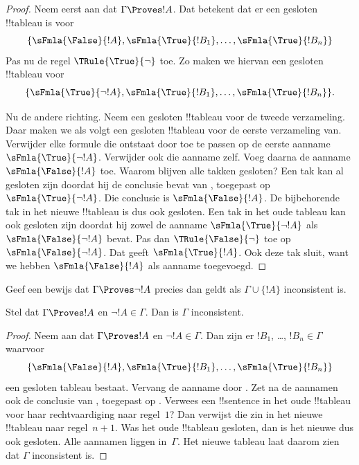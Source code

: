 \documentclass[../../../include/open-logic-section]{subfiles}
\begin{document}
\begin{proof}
Neem eerst aan dat $\Gamma \Proves !A$. Dat betekent dat er een
gesloten !!{tableau} is voor
\[
\{\sFmla{\False}{!A},
\sFmla{\True}{!B_1}, \dots, \sFmla{\True}{!B_n}\}
\]
Pas nu de regel $\TRule{\True}{\lnot}$ toe. Zo maken we hiervan een
gesloten !!{tableau} voor
\[
\{\sFmla{\True}{\lnot !A},
\sFmla{\True}{!B_1}, \dots, \sFmla{\True}{!B_n}\}.
\]

Nu de andere richting. Neem een gesloten !!{tableau} voor de tweede
verzameling. Daar maken we als volgt een gesloten !!{tableau} voor de
eerste verzameling van. Verwijder elke formule die ontstaat door
\TRule{\True}{\lnot} toe te passen op de eerste aanname
$\sFmla{\True}{\lnot !A}$. Verwijder ook die aanname zelf. Voeg daarna
de aanname $\sFmla{\False}{!A}$ toe.
Waarom blijven alle takken gesloten? Een tak kan al gesloten zijn
doordat hij de conclusie bevat van \TRule{\True}{\lnot}, toegepast op
$\sFmla{\True}{\lnot !A}$. Die conclusie is
$\sFmla{\False}{!A}$. De bijbehorende tak in het nieuwe !!{tableau} is
dus ook gesloten. Een tak in het oude tableau kan ook gesloten zijn
doordat hij zowel de aanname $\sFmla{\True}{\lnot !A}$ als
$\sFmla{\False}{\lnot !A}$ bevat. Pas dan
$\TRule{\False}{\lnot}$ toe op $\sFmla{\False}{\lnot !A}$. Dat geeft
$\sFmla{\True}{!A}$. Ook deze tak sluit, want we hebben
$\sFmla{\False}{!A}$ als aanname toegevoegd.
\end{proof}

\begin{prob}
Geef een bewijs dat $\Gamma \Proves \lnot !A$ precies dan geldt als
$\Gamma \cup \{!A\}$ inconsistent is.
\end{prob}

\begin{prop}
  Stel dat $\Gamma \Proves !A$ en $\lnot !A \in \Gamma$. Dan is
  $\Gamma$ inconsistent.
\end{prop}

\begin{proof}
  Neem aan dat $\Gamma \Proves !A$ en $\lnot !A \in \Gamma$. Dan zijn
  er $!B_1$, \dots, $!B_n \in \Gamma$ waarvoor \
  \[
  \{\sFmla{\False}{!A}, \sFmla{\True}{!B_1}, \dots, \sFmla{\True}{!B_n}\}
  \]
  een gesloten tableau bestaat. Vervang de aanname
   door . Zet na de aannamen
  ook de conclusie van \TRule{\True}{\lnot}, toegepast op
  . Verwees een !!{sentence} in het oude
  !!{tableau} voor haar rechtvaardiging naar regel~$1$? Dan verwijst
  die zin in het nieuwe !!{tableau} naar regel~$n+1$. Was het oude
  !!{tableau} gesloten, dan is het nieuwe dus ook gesloten. Alle
  aannamen liggen in~$\Gamma$. Het nieuwe tableau laat daarom zien dat
  $\Gamma$ inconsistent is.
\end{proof}
\end{document}
